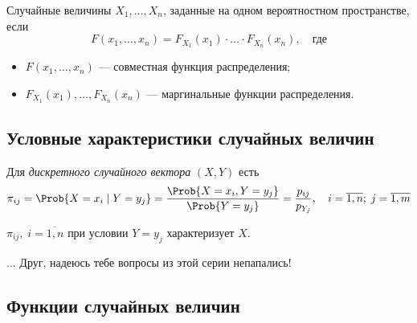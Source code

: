 \begin{definition}
	Случайные величины $X_1, \dots, X_n$, заданные на одном вероятностном пространстве,  если
	\[
		F(x_1, \dots, x_n) = F_{X_1}(x_1) \cdot \ldots \cdot F_{X_n}(x_n), \quad \text{где}
	\]
	\begin{itemize}
		\item $F(x_1, \dots, x_n)$ --- совместная функция распределения;
		\item $F_{X_1}(x_1), \ldots, F_{X_n}(x_n)$ --- маргинальные функции распределения.
	\end{itemize}
\end{definition}



\subsection{Условные характеристики случайных величин}

\begin{definition}
	Для \textit{дискретного случайного вектора} $(X, Y)$  есть
	\[
		\pi_{i j} = \Prob\{ X = x_i \mid Y = y_j \} = \frac{\Prob\{ X = x_i , Y = y_j \}}{\Prob\{ Y = y_j \}} = \frac{p_{i j}}{p_{Y_j}}, \quad i = \overline{1, n};\; j = \overline{1, m}
	\]
\end{definition}
\begin{rem}
	$\pi_{i j},\; i = \overline{1, n}$ при условии $Y = y_j$ характеризует  $X$.
\end{rem}

... Друг, надеюсь тебе вопросы из этой серии непапались!



\subsection{Функции случайных величин}
